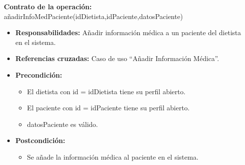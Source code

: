 \textbf{Contrato de la operación:} añadirInfoMedPaciente(idDietista,idPaciente,datosPaciente)
\begin{itemize}
\item \textbf{Responsabilidades:} Añadir información médica a un paciente del dietista en el sistema.
\item \textbf{Referencias cruzadas:} Caso de uso ``Añadir Información Médica''.
\item \textbf{Precondición:}
\begin{itemize}
\item El dietista con id = idDietista tiene su perfil abierto.
\item El paciente con id = idPaciente tiene su perfil abierto.
\item datosPaciente es válido.
\end{itemize}
\item \textbf{Postcondición:}
\begin{itemize}
\item Se añade la información médica al paciente en el sistema.
\end{itemize}
\end{itemize}


